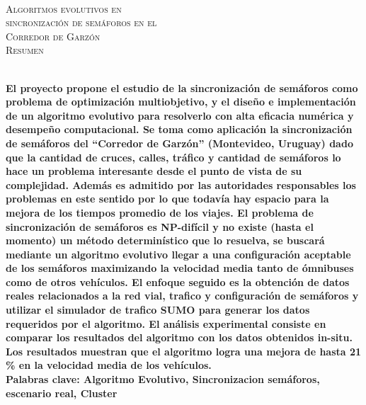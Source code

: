 {
\thispagestyle{empty}
~\\[0.2cm]
\begin{center}
    \textsc{\huge Algoritmos evolutivos en  } \\[0.2cm] 
    \textsc{\huge sincronización de semáforos en el  } \\[0.2cm]         
    \textsc{\huge Corredor de Garzón} \\[1cm]
    \textsc{\Large Resumen}
\end{center}
~\\[0.2cm]
\textbf{\large 
El proyecto propone el estudio de la sincronización de semáforos como problema de optimización multiobjetivo, y el diseño e implementación de un algoritmo evolutivo para resolverlo con alta eficacia numérica y desempeño computacional. \newline \newline
Se toma como aplicación la sincronización de semáforos del “Corredor de Garzón” (Montevideo, Uruguay) dado que la cantidad de cruces, calles, tráfico y cantidad de semáforos lo hace un problema interesante desde el punto de vista de su complejidad. Además es admitido por las autoridades responsables los problemas en este sentido por lo que todavía hay espacio para la mejora de los tiempos promedio de los viajes.  \newline \newline
El problema de sincronización de semáforos es NP-difícil y no existe (hasta el momento) un método determinístico que lo resuelva, se buscará mediante un algoritmo evolutivo llegar a una configuración aceptable de los semáforos maximizando la velocidad media tanto de ómnibuses como de otros vehículos.
El enfoque seguido es la obtención de datos reales relacionados a la red vial, trafico y configuración de semáforos y utilizar el simulador de trafico SUMO para generar los datos requeridos por el algoritmo.
El análisis experimental consiste en comparar los resultados del algoritmo con los datos obtenidos in-situ. Los resultados muestran que el algoritmo logra  una mejora de hasta 21 \% en la velocidad media de los vehículos.
 } 	
	~\\[1.0cm]
    \textbf{\large Palabras clave: Algoritmo Evolutivo, Sincronizacion semáforos, escenario real, Cluster}

}
\cleardoublepage
